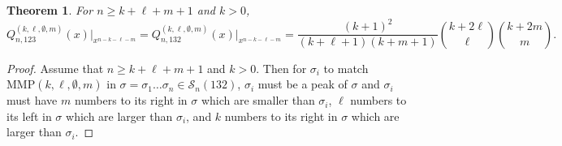 \documentclass[
final,nomarks
]{dmtcs-episciences}
\newtheorem{theorem}{Theorem}
\newcommand{\Sn}[1]{\mathcal{S}_{#1}}
\newcommand{\Qmmn}[2]{Q_{#2,132}^{(#1)}(x)}
\newcommand{\Qmn}[2]{Q_{#2,123}^{(#1)}(x)}
\newcommand{\MMP}{\mathrm{MMP}}
\begin{document}
\begin{theorem}\label{theorem:0004} For \begin{math}n \geq k+\ell+m+1\end{math} and \begin{math}k >0\end{math}, 
\begin{equation}
\Qmn{k,\ell,\emptyset,m}{n}\big\vert_{x^{n-k-\ell-m}}=\Qmmn{k,\ell,\emptyset,m}{n}\big\vert_{x^{n-k-\ell-m}}=\frac{(k+1)^2}{(k+\ell+1)(k+m+1)}\binom{k+2\ell}{\ell}\binom{k+2m}{m}.
\end{equation}
\end{theorem}
\begin{proof}
	Assume that \begin{math}n \geq k+\ell+m+1\end{math} and \begin{math}k > 0\end{math}. Then for \begin{math}\sigma_i\end{math} to match \begin{math}\MMP(k,\ell,\emptyset,m)\end{math} 
	in \begin{math}\sigma = \sigma_1 \ldots \sigma_n \in \Sn{n}(132)\end{math}, 
	\begin{math}\sigma_i\end{math} must be a peak of \begin{math}\sigma\end{math} and \begin{math}\sigma_i\end{math} must have \begin{math}m\end{math} numbers to its right in \begin{math}\sigma\end{math} which are 
	smaller than \begin{math}\sigma_i\end{math}, \begin{math}\ell\end{math} numbers to its left in \begin{math}\sigma\end{math} which are 
	larger than \begin{math}\sigma_i\end{math}, and \begin{math}k\end{math} numbers to its right in \begin{math}\sigma\end{math} which are larger than \begin{math}\sigma_i\end{math}. 

\end{proof}
\end{document}
